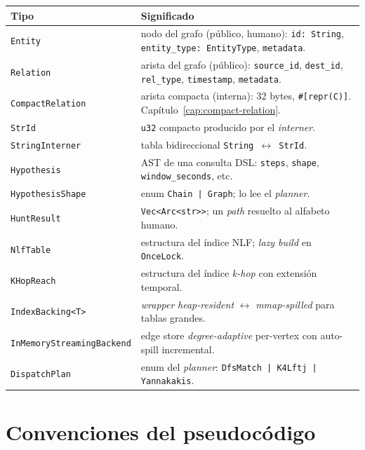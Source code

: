 \begin{center}
\renewcommand{\arraystretch}{1.3}
\begin{longtable}{p{4.0cm}p{9.0cm}}
\toprule
\textbf{Tipo} & \textbf{Significado} \\
\midrule
\texttt{Entity}              & nodo del grafo (público, humano): \texttt{id: String}, \texttt{entity\_type: EntityType}, \texttt{metadata}. \\
\texttt{Relation}            & arista del grafo (público): \texttt{source\_id}, \texttt{dest\_id}, \texttt{rel\_type}, \texttt{timestamp}, \texttt{metadata}. \\
\texttt{CompactRelation}     & arista compacta (interna): 32 bytes, \texttt{\#[repr(C)]}. Capítulo~\ref{cap:compact-relation}. \\
\texttt{StrId}               & \texttt{u32} compacto producido por el \emph{interner}. \\
\texttt{StringInterner}      & tabla bidireccional \texttt{String \(\leftrightarrow\) StrId}. \\
\texttt{Hypothesis}          & AST de una consulta DSL: \texttt{steps}, \texttt{shape}, \texttt{window\_seconds}, etc. \\
\texttt{HypothesisShape}     & enum \texttt{Chain | Graph}; lo lee el \emph{planner}. \\
\texttt{HuntResult}          & \texttt{Vec<Arc<str>>}; un \emph{path} resuelto al alfabeto humano. \\
\texttt{NlfTable}            & estructura del índice NLF; \emph{lazy build} en \texttt{OnceLock}. \\
\texttt{KHopReach}           & estructura del índice \emph{k-hop} con extensión temporal. \\
\texttt{IndexBacking<T>}     & \emph{wrapper} \emph{heap-resident} \(\leftrightarrow\) \emph{mmap-spilled} para tablas grandes. \\
\texttt{InMemoryStreamingBackend} & edge store \emph{degree-adaptive} per-vertex con auto-spill incremental. \\
\texttt{DispatchPlan}        & enum del \emph{planner}: \texttt{DfsMatch | K4Lftj | Yannakakis}. \\
\bottomrule
\end{longtable}
\end{center}

\section{Convenciones del pseudocódigo}

